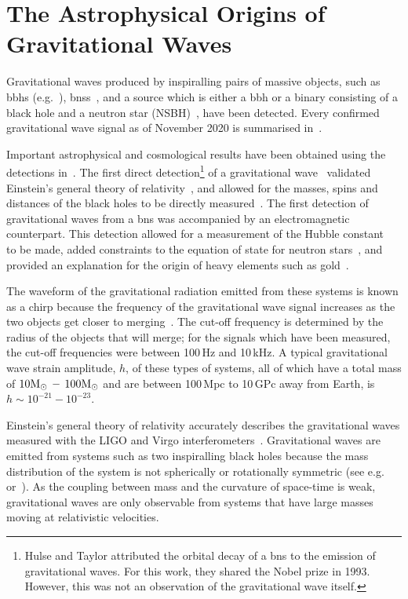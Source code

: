 \section{The Astrophysical Origins of Gravitational Waves}
\label{sec:detector_chapter_gw_origins}
Gravitational waves produced by inspiralling pairs of massive objects, such as \glspl{bbh} (e.g.~\cite{Abbott2016,Abbott2017b,Abbott2020b,Abbott2020c}), \glspl{bns}~\cite{Abbott2017a,Abbott2020d}, and a source which is either a \gls{bbh} or a binary consisting of a black hole and a neutron star (NSBH)~\cite{Abbott2020a}, have been detected. Every confirmed gravitational wave signal as of November 2020 is summarised in~\cite{Abbott2020}. 
\par
Important astrophysical and cosmological results have been obtained using the detections in~\cite{Abbott2020}. The first direct detection\footnote{Hulse and Taylor attributed the orbital decay of a \gls{bns} to the emission of  gravitational waves. For this work, they shared the Nobel prize in 1993. However, this was not an observation of the gravitational wave itself.} of a gravitational wave~\cite{Abbott2016} validated Einstein's general theory of relativity~\cite{Abbott2016d}, and allowed for the masses, spins and distances of the black holes to be directly measured~\cite{Abbott2016e}. The first detection of gravitational waves from a \gls{bns} was accompanied by an electromagnetic counterpart. This detection allowed for a measurement of the Hubble constant~\cite{Abbott2017d} to be made, added constraints to the equation of state for neutron stars~\cite{Abbott2018a}, and provided an explanation for the origin of heavy elements such as gold~\cite{Abbott2017f}.
\par
The waveform of the gravitational radiation emitted from these systems is known as a chirp because the frequency of the gravitational wave signal increases as the two objects get closer to merging~\cite{Abbott2016c}. The cut-off frequency is determined by the radius of the objects that will merge; for the signals which have been measured, the cut-off frequencies were between 100\,Hz and 10\,kHz. A typical gravitational wave strain amplitude, $h$, of these types of systems, all of which have a total mass of $10\rm{M_\odot}\,-\,100\rm{M_\odot}$ and are between 100\,Mpc to 10\,GPc away from Earth, is $h\sim\!10^{-21}-10^{-23}$. 
\par
Einstein's general theory of relativity accurately describes the gravitational waves measured with the LIGO and Virgo interferometers~\cite{Collaboration2020}. Gravitational waves are emitted from systems such as two inspiralling black holes because the mass distribution of the system is not spherically or rotationally symmetric (see e.g.~\cite{charlesmisner2017} or~\cite{Schutz2009}). As the coupling between mass and the curvature of space-time is weak, gravitational waves are only observable from systems that have large masses moving at relativistic velocities.
